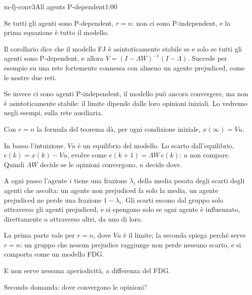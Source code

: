 \begin{slide}{m-fj-conv3}{All agents P-dependent}{1:00}
  \begin{discorso}
    \item Se tutti gli agenti sono P-dependent, $r=n$: non ci sono P-independent, e la prima equazione è tutto il modello.
    \item Il corollario dice che il modello FJ è asintoticamente stabile se e solo se tutti gli agenti sono P-dependent, e allora $V=(I-\Lambda W)^{-1}(I-\Lambda)$. Succede per esempio su una rete fortemente connessa con almeno un agente prejudiced, come le nostre due reti.
    \item Se invece ci sono agenti P-independent, il modello può ancora convergere, ma non è asintoticamente stabile: il limite dipende dalle loro opinioni iniziali. Lo vedremo negli esempi, sulla rete ausiliaria.
    \item Con $r=n$ la formula del teorema dà, per ogni condizione iniziale, $x(\infty)=Vu$.
    \item In basso l'intuizione. $Vu$ è un equilibrio del modello. Lo scarto dall'equilibrio, $e(k)=x(k)-Vu$, evolve come $e(k+1)=\Lambda W\,e(k)$: $u$ non compare. Quindi $\Lambda W$ decide se le opinioni convergono, $u$ decide dove.
    \item A ogni passo l'agente $i$ tiene una frazione $\lambda_i$ della media pesata degli scarti degli agenti che ascolta: un agente non prejudiced fa solo la media, un agente prejudiced ne perde una frazione $1-\lambda_i$. Gli scarti escono dal gruppo solo attraverso gli agenti prejudiced, e si spengono solo se ogni agente è influenzato, direttamente o attraverso altri, da uno di loro.
    \item La prima parte vale per $r=n$, dove $Vu$ è il limite; la seconda spiega perché serve $r=n$: un gruppo che nessun prejudice raggiunge non perde nessuno scarto, e si comporta come un modello FDG.
    \item E non serve nessuna aperiodicità, a differenza del FDG.
    \item Seconda domanda: dove convergono le opinioni?
  \end{discorso}
\end{slide}

